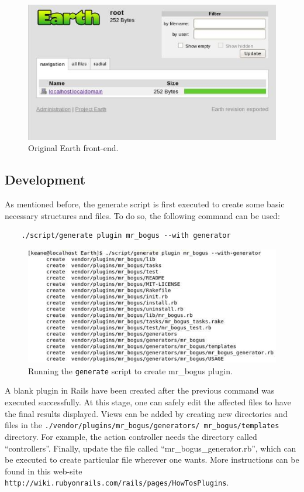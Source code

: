 \documentclass{article}
\begin{document}
\begin{figure}
    \centering
    \includegraphics[scale=0.5]{fig/instruction-1.jpg}
    \caption{Original Earth front-end.}
    \label{fig:instruction-1}
\end{figure}

\subsection{Development} %

As mentioned before, the generate script is first executed to create some basic necessary structures and files. To do so, the following command can be used:

\begin{verbatim}
    ./script/generate plugin mr_bogus --with generator
\end{verbatim}

\begin{figure}
    \centering
    \includegraphics[scale=0.5]{fig/instruction-2.jpg}
    \caption{Running the \texttt{generate} script to create mr\_bogus plugin.}
    \label{fig:instruction-2}
\end{figure}

A blank plugin in Rails have been created after the previous command was executed successfully. At this stage, one can safely edit the affected files to have the final results displayed. Views can be added by creating new directories and files in the \texttt{./vendor/plugins/mr\_bogus/generators/ mr\_bogus/templates} directory. For example, the action controller needs the directory called ``controllers''. Finally, update the file called ``mr\_bogus\_generator.rb'', which can be executed to create particular file wherever one wants. More instructions can be found in this web-site \texttt{http://wiki.rubyonrails.com/rails/pages/HowTosPlugins}.
\end{document}
